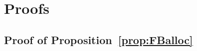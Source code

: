\documentclass[master.tex]{subfiles}
\begin{document}


\section{Proofs}


\subsection{Proof of Proposition~\ref{prop:FBalloc}}

\end{document}
